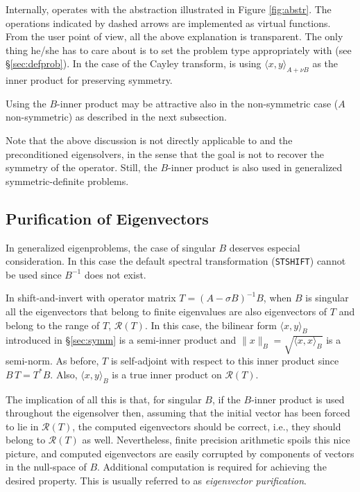 	Internally, \slepc operates with the abstraction illustrated in Figure \ref{fig:abstr}. The operations indicated by dashed arrows are implemented as virtual functions. From the user point of view, all the above explanation is transparent. The only thing he/she has to care about is to set the problem type appropriately with  (see \S\ref{sec:defprob}).
	In the case of the Cayley transform, \slepc is using $\langle x,y\rangle_{A+\nu B}$ as the inner product for preserving symmetry.

	Using the $B$-inner product may be attractive also in the non-symmetric case ($A$ non-symmetric) as described in the next subsection.

	Note that the above discussion is not directly applicable to  and the preconditioned eigensolvers, in the sense that the goal is not to recover the symmetry of the operator. Still, the $B$-inner product is also used in generalized symmetric-definite problems.

\subsection{Purification of Eigenvectors}
\label{sec:purif}

In generalized eigenproblems, the case of singular $B$ deserves especial consideration. In this case the default spectral transformation (\texttt{STSHIFT}) cannot be used since $B^{-1}$ does not exist.

In shift-and-invert with operator matrix $T=(A-\sigma B)^{-1}B$, when $B$ is singular all the eigenvectors that belong to finite eigenvalues are also eigenvectors of $T$ and belong to the range of $T$, $\mathcal{R}(T)$. In this case, the bilinear form $\langle x,y\rangle_B$ introduced in \S\ref{sec:symm} is a semi-inner product and $\|x\|_B=\sqrt{\langle x,x\rangle_B}$ is a semi-norm. As before, $T$ is self-adjoint with respect to this inner product since $B\,T=T^*B$. Also, $\langle x,y\rangle_B$ is a true inner product on $\mathcal{R}(T)$.

The implication of all this is that, for singular $B$, if the $B$-inner product is used throughout the eigensolver then, assuming that the initial vector has been forced to lie in $\mathcal{R}(T)$, the computed eigenvectors should be correct, i.e., they should belong to $\mathcal{R}(T)$ as well. Nevertheless, finite precision arithmetic spoils this nice picture, and computed eigenvectors are easily corrupted by components of vectors in the null-space of $B$. Additional computation is required for achieving the desired property. This is usually referred to as \emph{eigenvector purification}.

